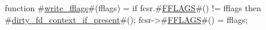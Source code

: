 function #\hyperref[sailRISCVzwritezyfflags]{write\_fflags}#(fflags) = {
  if   fcsr.#\hyperref[sailRISCVzFFLAGS]{FFLAGS}#() != fflags
  then #\hyperref[sailRISCVzdirtyzyfdzycontextzyifzypresent]{dirty\_fd\_context\_if\_present}#();
  fcsr->#\hyperref[sailRISCVzFFLAGS]{FFLAGS}#() = fflags;
}

